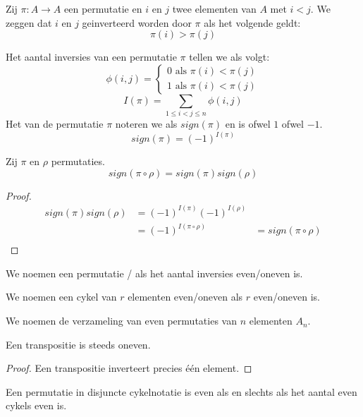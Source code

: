 \documentclass[main.tex]{subfiles}
\begin{document}
\begin{de}
  Zij $\pi: A \rightarrow A$ een permutatie en $i$ en $j$ twee elementen van $A$ met $i < j$.
  We zeggen dat $i$ en $j$ geinverteerd worden door $\pi$ als het volgende geldt:
  \[ \pi(i) > \pi(j) \]
\end{de}

\begin{de}
  Het aantal inversies van een permutatie $\pi$ tellen we als volgt:
  \[
  \phi(i,j) =
  \left\{
  \begin{array}{lc}
    0 \text{ als } \pi(i) < \pi(j)\\
    1 \text{ als } \pi(i) < \pi(j)
  \end{array}
  \right.
  \]
  \[ I(\pi) = \sum_{1\le i < j \le n}\phi(i,j) \]
  Het  van de permutatie $\pi$ noteren we als $sign(\pi)$ en is ofwel $1$ ofwel $-1$.
  \[ sign(\pi) = (-1)^{I(\pi)}\] 
\end{de}

\begin{ei}
  \label{ei:samenstelling-permutaties-teken}
  Zij $\pi$ en $\rho$ permutaties.
  \[ sign(\pi\circ\rho) = sign(\pi)sign(\rho) \] 
  \begin{proof}
    \[
    \begin{array}{rll}
      sign(\pi)sign(\rho) &= (-1)^{I(\pi)} (-1)^{I(\rho)} &\\
                          &= (-1)^{I(\pi\circ\rho)}      &=sign(\pi\circ\rho)\\
    \end{array}
    \]
  \end{proof}
\end{ei}

\begin{de}
  We noemen een permutatie / als het aantal inversies even/oneven is.
\end{de}

\begin{de}
  We noemen een cykel van $r$ elementen even/oneven als $r$ even/oneven is.
\end{de}

\begin{de}
  \label{de:even-permutaties}
  We noemen de verzameling van even permutaties van $n$ elementen $A_{n}$.
\end{de}

\begin{st}
  Een transpositie is steeds oneven.
  \begin{proof}
    Een transpositie inverteert precies \'e\'en element.
  \end{proof}
\end{st}

\begin{st}
  Een permutatie in disjuncte cykelnotatie is even als en slechts als het aantal even cykels even is.

\end{st}
\end{document}
